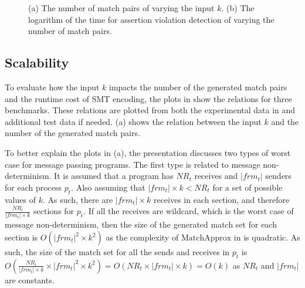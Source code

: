 \begin{figure}[!h]
\begin{minipage}{.5\textwidth}
\end{minipage}
\caption{(a) The number of match pairs of varying the input $k$. (b) The logarithm of the time for assertion violation detection of varying the number of match pairs.}
\label{fig:relation}
\end{figure}

\subsection{Scalability}

To evaluate how the input $k$ impacts the number of the generated match pairs and the runtime cost of SMT encoding, the plots in  show the relations for three benchmarks. 
These relations are plotted from both the experimental data in  and additional test data if needed.  (a) shows the relation between the input $k$ and the number of the generated match pairs. 

To better explain the plots in  (a), the presentation discusses two types of worst case for message passing programs. 
The first type is related to message non-determinism. 
It is assumed that a program has $\mathit{NR}_t$ receives and $|frm_t|$ senders for each process $p_t$. Also assuming that $|frm_t|\times k < \mathit{NR}_t$ for a set of possible values of $k$. As such, there are $|frm_t|\times k$ receives in each section, and therefore $\frac{\mathit{NR}_t}{|frm_t|\times k}$ sections for $p_t$.
If all the receives are wildcard, which is the worst case of message non-determinism, then the size of the generated match set for each section is $O(|frm_t|^2\times k^2)$ as the complexity of $\mathrm{MatchApprox}$ in  is quadratic. 
As such, the size of the match set for all the sends and receives in $p_t$ is $O(\frac{\mathit{NR}_t}{|frm_t|\times k} \times |frm_t|^2\times k^2) = O(\mathit{NR}_t \times |frm_t| \times k) = O(k)$ as $\mathit{NR}_t$ and $|frm_t|$ are constants. 

